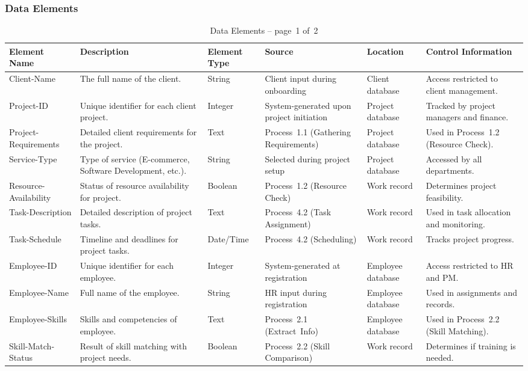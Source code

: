 \documentclass[12pt,a4paper]{article}
\begin{document}
\subsubsection{Data Elements}

\begin{table}[H]
\centering
\begin{tabular}{|p{2.8cm}|p{4cm}|p{1.8cm}|p{2.3cm}|p{1.8cm}|p{2.5cm}|}
\hline
\rowcolor{tableheader}
\textcolor{headertext}{\textbf{Element Name}} &
\textcolor{headertext}{\textbf{Description}} &
\textcolor{headertext}{\textbf{Element Type}} &
\textcolor{headertext}{\textbf{Source}} &
\textcolor{headertext}{\textbf{Location}} &
\textcolor{headertext}{\textbf{Control Information}} \\
\hline
Client-Name & The full name of the client. & String & Client input during onboarding & Client database & Access restricted to client management. \\
\hline
Project-ID & Unique identifier for each client project. & Integer & System-generated upon project initiation & Project database & Tracked by project managers and finance. \\
\hline
Project-Requirements & Detailed client requirements for the project. & Text & Process 1.1 (Gathering Requirements) & Project database & Used in Process 1.2 (Resource Check). \\
\hline
Service-Type & Type of service (E-commerce, Software Development, etc.). & String & Selected during project setup & Project database & Accessed by all departments. \\
\hline
Resource-Availability & Status of resource availability for project. & Boolean & Process 1.2 (Resource Check) & Work record & Determines project feasibility. \\
\hline
Task-Description & Detailed description of project tasks. & Text & Process 4.2 (Task Assignment) & Work record & Used in task allocation and monitoring. \\
\hline
Task-Schedule & Timeline and deadlines for project tasks. & Date/Time & Process 4.2 (Scheduling) & Work record & Tracks project progress. \\
\hline
Employee-ID & Unique identifier for each employee. & Integer & System-generated at registration & Employee database & Access restricted to HR and PM. \\
\hline
Employee-Name & Full name of the employee. & String & HR input during registration & Employee database & Used in assignments and records. \\
\hline
Employee-Skills & Skills and competencies of employee. & Text & Process 2.1 (Extract Info) & Employee database & Used in Process 2.2 (Skill Matching). \\
\hline
Skill-Match-Status & Result of skill matching with project needs. & Boolean & Process 2.2 (Skill Comparison) & Work record & Determines if training is needed. \\
\hline
\end{tabular}
\caption{Data Elements – page 1 of 2}
\label{tab:data_elements_part1}
\end{table}
\end{document}
